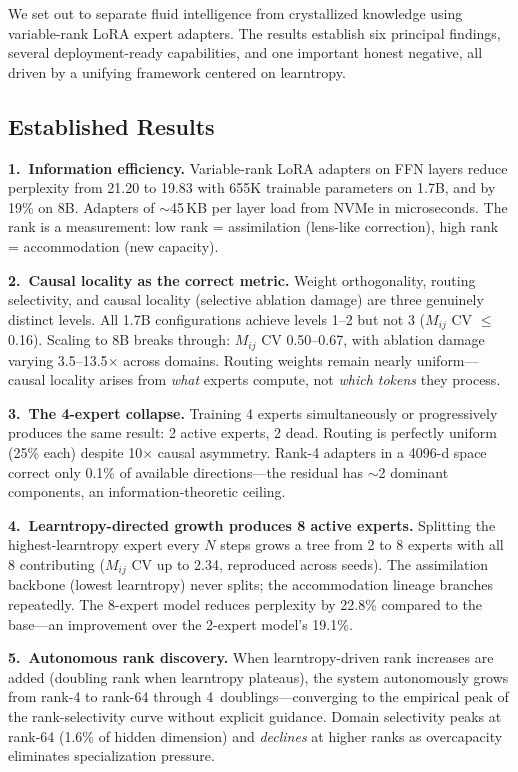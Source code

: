 \documentclass{article}
\begin{document}
We set out to separate fluid intelligence from crystallized knowledge using
variable-rank LoRA expert adapters. The results establish six principal
findings, several deployment-ready capabilities, and one important honest
negative, all driven by a unifying framework centered on learntropy.

\subsection{Established Results}

\textbf{1.~Information efficiency.} Variable-rank LoRA adapters on FFN layers
reduce perplexity from 21.20 to 19.83 with 655K trainable parameters on
1.7B, and by 19\% on 8B. Adapters of $\sim$45\,KB per layer load from
NVMe in microseconds. The rank is a measurement: low rank = assimilation
(lens-like correction), high rank = accommodation (new capacity).

\textbf{2.~Causal locality as the correct metric.} Weight orthogonality,
routing selectivity, and causal locality (selective ablation damage) are three
genuinely distinct levels. All 1.7B configurations achieve levels 1--2 but not
3 ($M_{ij}$ CV $\leq$ 0.16). Scaling to 8B breaks through: $M_{ij}$ CV
0.50--0.67, with ablation damage varying 3.5--13.5$\times$ across domains.
Routing weights remain nearly uniform---causal locality arises from
\emph{what} experts compute, not \emph{which tokens} they process.

\textbf{3.~The 4-expert collapse.} Training 4 experts simultaneously or
progressively produces the same result: 2 active experts, 2 dead. Routing is
perfectly uniform (25\% each) despite 10$\times$ causal asymmetry. Rank-4
adapters in a 4096-d space correct only 0.1\% of available directions---the
residual has $\sim$2 dominant components, an information-theoretic ceiling.

\textbf{4.~Learntropy-directed growth produces 8 active experts.}
Splitting the highest-learntropy expert every $N$ steps grows a tree from 2
to 8 experts with all 8 contributing ($M_{ij}$ CV up to 2.34, reproduced
across seeds). The assimilation backbone (lowest learntropy) never splits;
the accommodation lineage branches repeatedly. The 8-expert model reduces
perplexity by 22.8\% compared to the base---an improvement over the
2-expert model's 19.1\%.

\textbf{5.~Autonomous rank discovery.} When learntropy-driven rank increases
are added (doubling rank when learntropy plateaus), the system autonomously
grows from rank-4 to rank-64 through 4~doublings---converging to the
empirical peak of the rank-selectivity curve without explicit guidance.
Domain selectivity peaks at rank-64 (1.6\% of hidden dimension) and
\emph{declines} at higher ranks as overcapacity eliminates specialization
pressure.
\end{document}

